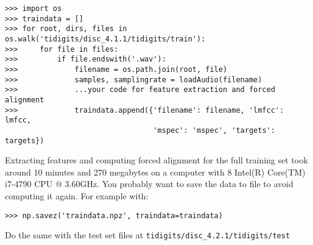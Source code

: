 \documentclass{nada-ten}
\begin{document}
\begin{verbatim}
>>> import os
>>> traindata = []
>>> for root, dirs, files in os.walk('tidigits/disc_4.1.1/tidigits/train'):
>>>     for file in files:
>>>         if file.endswith('.wav'):
>>>             filename = os.path.join(root, file)
>>>             samples, samplingrate = loadAudio(filename)
>>>             ...your code for feature extraction and forced alignment
>>>             traindata.append({'filename': filename, 'lmfcc': lmfcc,
                                  'mspec': 'mspec', 'targets': targets})
\end{verbatim}

Extracting features and computing forced alignment for the full training set took around 10 minutes and 270 megabytes on a computer with 8 Intel(R) Core(TM) i7-4790 CPU @ 3.60GHz. You probably want to save the data to file to avoid computing it again. For example with:
\begin{verbatim}
>>> np.savez('traindata.npz', traindata=traindata)
\end{verbatim}
Do the same with the test set files at \texttt{tidigits/disc\_4.2.1/tidigits/test}


%
\end{document}
